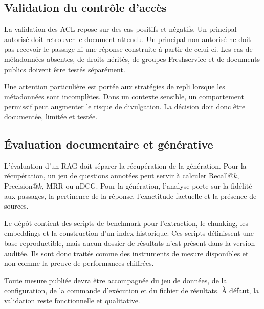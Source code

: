 \subsection{Validation du contrôle d'accès}

La validation des ACL repose sur des cas positifs et négatifs. Un principal autorisé doit retrouver le document attendu. Un principal non autorisé ne doit pas recevoir le passage ni une réponse construite à partir de celui-ci. Les cas de métadonnées absentes, de droits hérités, de groupes Freshservice et de documents publics doivent être testés séparément.

Une attention particulière est portée aux stratégies de repli lorsque les métadonnées sont incomplètes. Dans un contexte sensible, un comportement permissif peut augmenter le risque de divulgation. La décision doit donc être documentée, limitée et testée.

\subsection{Évaluation documentaire et générative}

L'évaluation d'un RAG doit séparer la récupération de la génération. Pour la récupération, un jeu de questions annotées peut servir à calculer Recall@$k$, Precision@$k$, MRR ou nDCG. Pour la génération, l'analyse porte sur la fidélité aux passages, la pertinence de la réponse, l'exactitude factuelle et la présence de sources.

Le dépôt contient des scripts de benchmark pour l'extraction, le chunking, les embeddings et la construction d'un index historique. Ces scripts définissent une base reproductible, mais aucun dossier de résultats n'est présent dans la version auditée. Ils sont donc traités comme des instruments de mesure disponibles et non comme la preuve de performances chiffrées.

Toute mesure publiée devra être accompagnée du jeu de données, de la configuration, de la commande d'exécution et du fichier de résultats. À défaut, la validation reste fonctionnelle et qualitative.

